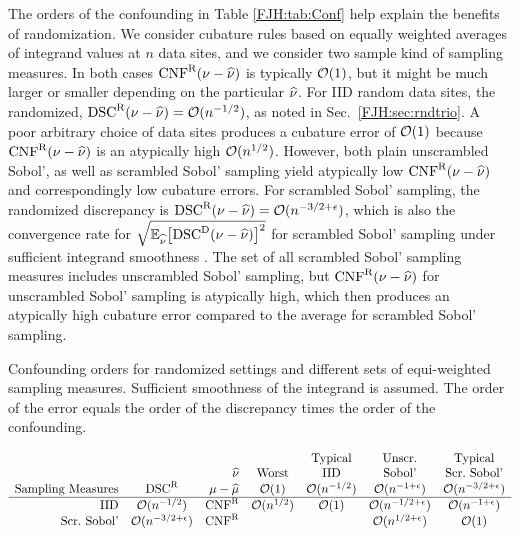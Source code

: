 \documentclass[graybox,footinfo]{svmult}
\begin{document}
The orders of the confounding in Table \ref{FJH:tab:Conf} help explain the 
benefits of randomization.  We consider cubature rules based on equally weighted 
averages of integrand values at $n$ data sites, and we consider two sample kind of 
sampling measures.  In both cases $\textup{CNF}^{\textup{R}}(\nu - \widehat{\nu})$ is 
typically ${\mathcal{O}}(1)$, but it might be much larger or smaller depending on the particular 
$\widehat{\nu}$.  For IID random data sites, the 
randomized, $\textup{DSC}^{\textup{R}}(\nu - \widehat{\nu}) = {\mathcal{O}}(n^{-1/2})$, as noted in Sec.\ 
\ref{FJH:sec:rndtrio}.  A poor 
arbitrary choice of data sites produces a cubature error of ${\mathcal{O}}(1)$ because 
$\textup{CNF}^{\textup{R}}(\nu - \widehat{\nu})$ is an atypically high ${\mathcal{O}}(n^{1/2})$.  
However, both plain unscrambled Sobol', as well as scrambled Sobol' sampling yield 
atypically low $\textup{CNF}^{\textup{R}}(\nu - \widehat{\nu})$ and correspondingly low cubature errors.  For 
scrambled Sobol' sampling, the randomized discrepancy is $\textup{DSC}^{\textup{R}}(\nu - \widehat{\nu}) 
={\mathcal{O}}(n^{-3/2 + 
\epsilon})$, which is also the convergence rate for $\sqrt{{\mathbb{E}}_{\widehat{\nu}}\bigl[\textup{DSC}^{\textup{D}}(\nu - 
\widehat{\nu})\bigr ]^2}$ for scrambled 
Sobol' sampling under sufficient integrand smoothness \cite{HicHon98a, HicYue00}.
The set of all scrambled Sobol' sampling measures includes 
unscrambled 
Sobol' 
sampling, but $\textup{CNF}^{\textup{R}}(\nu - \widehat{\nu})$ for unscrambled Sobol' sampling is atypically high, 
which then produces an atypically high
cubature error compared to the average for scrambled Sobol' sampling.

\begin{table}
	\caption{Confounding orders for randomized settings and 
		different sets of equi-weighted 
		sampling measures. Sufficient smoothness of the integrand is assumed.
		The order of the error equals the order of the discrepancy times the 
		order of the confounding. \label{FJH:tab:Conf}}
	\begin{equation*}
	\begin{array}{r@{\quad }c@{\quad }r@{\quad}c@{\quad}c@{\quad}c@{\quad}c}
	&&&&\text{Typical} &  \textup{Unscr.} &\text{Typical}\\
	\multicolumn{3}{r@{\quad}}{\hnu} &  \textup{Worst} &  \textup{IID} &
	\textup{Sobol'}&  \textup{Scr.\ Sobol'}\\
	\textup{Sampling Measures} & \disc^\Rn & \mu - \hmu & \calO(1) & \calO(n^{-1/2}) & 
	\calO(n^{-1+\epsilon}) & 
	\calO(n^{-3/2+\epsilon})\\
	\hline 
	\textup{IID} & \calO(n^{-1/2}) & \algn^\Rn & \calO(n^{1/2})  & \calO(1) 
	&\calO(n^{-1/2+\epsilon}) &\calO(n^{-1+\epsilon}) \\
	\textup{Scr.\ Sobol'} &\calO(n^{-3/2+\epsilon}) & \algn^\Rn 
	& & &\calO(n^{1/2+\epsilon})&\calO(1) 
	\end{array}
	\end{equation*}
\end{table}
\end{document}
